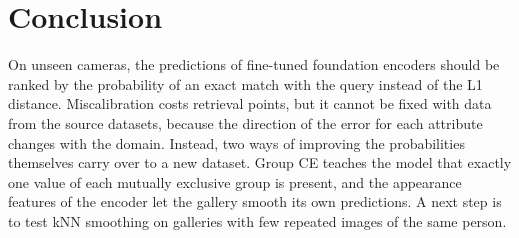 \documentclass[10pt,twocolumn,letterpaper]{article}
\begin{document}
\section{Conclusion}
\label{sec:conclusion}

On unseen cameras, the predictions of fine-tuned foundation encoders should be ranked by the probability of an exact match with the query instead of the L1 distance. Miscalibration costs retrieval points, but it cannot be fixed with data from the source datasets, because the direction of the error for each attribute changes with the domain. Instead, two ways of improving the probabilities themselves carry over to a new dataset. Group CE teaches the model that exactly one value of each mutually exclusive group is present, and the appearance features of the encoder let the gallery smooth its own predictions. A next step is to test kNN smoothing on galleries with few repeated images of the same person.

{\small


}
\end{document}
